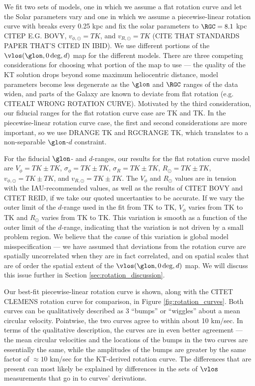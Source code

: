 We fit two sets of models, one in which we assume a flat rotation curve and let the Solar parameters vary and one in which we assume a piecewise-linear rotation curve with breaks every 0.25 kpc and fix the solar parameters to $\RGC=8.1$ kpc CITEP E.G. BOVY, $v_{\phi, \odot}=TK$, and $v_{R, \odot}=TK$ (CITE THAT STANDARDS PAPER THAT'S CITED IN IBID).
We use different portions of the $\vlos(\glon, 0\deg, d)$ map for the different models. 
There are three competing considerations for choosing what portion of the map to use --- the quality of the KT solution drops beyond some maximum heliocentric distance, model parameters become less degenerate as the $\glon$ and $\RGC$ ranges of the data widen, and parts of the Galaxy are known to deviate from flat rotation (e.g. CITEALT WRONG ROTATION CURVE). 
Motivated by the third consideration, our fiducial ranges for the flat rotation curve case are TK and TK. 
In the piecewise-linear rotation curve case, the first and second considerations are more important, so we use DRANGE TK and RGCRANGE TK, which translates to a non-separable $\glon$-$d$ constraint.

For the fiducial $\glon$- and $d$-ranges, our results for the flat rotation curve model are $V_\phi=TK \pm TK$, $\sigma_\phi = TK \pm TK$, $\sigma_R = TK \pm TK$, $R_\odot = TK \pm TK$, $v_{\phi, \odot} = TK \pm TK$, and $v_{R, \odot} = TK \pm TK$.
The $V_\phi$ and $R_{\odot}$ values are in tension with the IAU-recommended values, as well as the results of CITET BOVY and CITET REID, if we take our quoted uncertanties to be accurate. 
If we vary the outer limit of the $d$-range used in the fit from TK to TK, $V_\phi$ varies from TK to TK and $R_\odot$ varies from TK to TK. 
This variation is smooth as a function of the outer limit of the $d$-range, indicating that the variation is not driven by a small problem region.
We believe that the cause of this variation is global model misspecification --- we have assumed that deviations from the rotation curve are spatially uncorrelated when they are in fact correlated, and on spatial scales that are of order the spatial extent of the $\vlos(\glon, 0\deg, d)$ map.
We will discuss this issue further in Section \ref{sec:rotation_discussion}. 

Our best-fit piecewise-linear rotation curve is shown, along with the CITET CLEMENS rotation curve for comparison, in Figure \ref{fig:rotation_curves}. 
Both curves can be qualitatively described as 3 ``bumps'' or ``wiggles'' about a mean circular velocity. 
Pointwise, the two curves agree to within about 10 km/sec. 
In terms of the qualitative description, the curves are in even better agreement --- the mean circular velocities and the locations of the bumps in the two curves are essentially the same, while the amplitudes of the bumps are greater by the same factor of $\approx 10$ km/sec for the KT-derived rotation curve.
The differences that are present can most likely be explained by differences in the sets of $\vlos$ measurements that go in to curves' derivations. 

